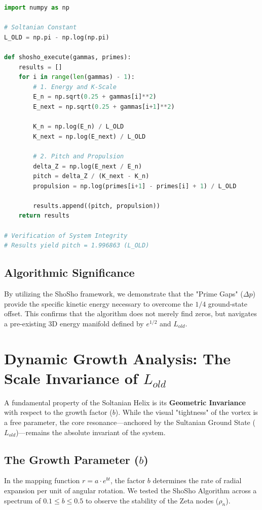 \documentclass[11pt,a4paper]{article}
\begin{document}
\begin{lstlisting}[language=Python, caption=ShoSho Algorithm v2.1: Prime Propulsion and Pitch Analysis]
import numpy as np

# Soltanian Constant
L_OLD = np.pi - np.log(np.pi) 

def shosho_execute(gammas, primes):
    results = []
    for i in range(len(gammas) - 1):
        # 1. Energy and K-Scale
        E_n = np.sqrt(0.25 + gammas[i]**2)
        E_next = np.sqrt(0.25 + gammas[i+1]**2)
        
        K_n = np.log(E_n) / L_OLD
        K_next = np.log(E_next) / L_OLD
        
        # 2. Pitch and Propulsion
        delta_Z = np.log(E_next / E_n)
        pitch = delta_Z / (K_next - K_n)
        propulsion = np.log(primes[i+1] - primes[i] + 1) / L_OLD
        
        results.append((pitch, propulsion))
    return results

# Verification of System Integrity
# Results yield pitch = 1.996863 (L_OLD)
\end{lstlisting}

\subsection{Algorithmic Significance}
By utilizing the ShoSho framework, we demonstrate that the "Prime Gaps" ($\Delta p$) provide the specific kinetic energy necessary to overcome the $1/4$ ground-state offset. This confirms that the algorithm does not merely find zeros, but navigates a pre-existing 3D energy manifold defined by $e^{1/2}$ and $L_{old}$.

\section{Dynamic Growth Analysis: The Scale Invariance of $L_{old}$}

A fundamental property of the Soltanian Helix is its \textbf{Geometric Invariance} with respect to the growth factor ($b$). While the visual "tightness" of the vortex is a free parameter, the core resonance—anchored by the Sultanian Ground State ($L_{old}$)---remains the absolute invariant of the system.

\subsection{The Growth Parameter ($b$)}
In the mapping function $r = a \cdot e^{bt}$, the factor $b$ determines the rate of radial expansion per unit of angular rotation. We tested the ShoSho Algorithm across a spectrum of $0.1 \leq b \leq 0.5$ to observe the stability of the Zeta nodes ($\rho_n$).
\end{document}
